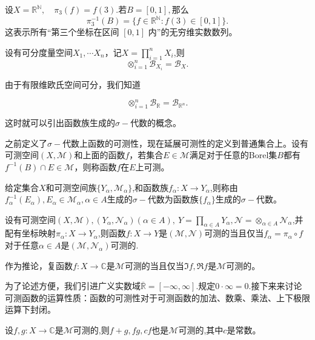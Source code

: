 \documentclass[lang=cn,10pt]{elegantbook}
\begin{document}
	\begin{example}[无穷维数列的坐标映射]
	设\(X = \mathbb{R}^\mathbb{N}, \quad \pi_3(f) = f(3).\)若\(B = [0,1],\)那么
	\[\pi_3^{-1}(B) = \{ f \in \mathbb{R}^\mathbb{N} : f(3) \in [0,1] \}.\]
	这表示所有“第三个坐标在区间 $[0,1]$ 内”的无穷维实数数列。
	\end{example}
	\begin{proposition}[P1.5]
		设有可分度量空间\(X_1,\cdots X_n\)，记\(X=\prod_{i=1}^{n}X_i\),则
		\[\otimes_{i=1}^n\mathcal{B}_{X_i}=\mathcal{B}_X.\]
	\end{proposition}
	由于有限维欧氏空间可分，我们知道
	\begin{corollary}[C1.6]
		\[\otimes_{i=1}^n\mathcal{B}_{\mathbb{R}}=\mathcal{B}_{\mathbb{R}^n}.\]
	\end{corollary}

	这时就可以引出函数族生成的\(\sigma-\)代数的概念。
	\begin{definition}
		之前定义了\(\sigma-\)代数上函数的可测性，现在延展可测性的定义到普通集合上。设有可测空间\((X,\mathcal{M})\)和上面的函数\(f\)，若集合\(E\in \mathcal{M}\)满足对于任意的Borel集\(B\)都有\(f^{-1}(B)\cap E\in \mathcal{M}\)，则称函数\(f\)在\(E\)上可测。

		给定集合\(X\)和可测空间族\(\{Y_\alpha,\mathcal{M}_\alpha\}\),和函数族\(f_\alpha:X\to Y_\alpha\),则称由\(f^{-1}_\alpha(E_\alpha),E_\alpha\in \mathcal{M}_\alpha,\alpha\in A\)生成的\(\sigma-\)代数为函数族\(\{f_\alpha\}\)生成的\(\sigma-\)代数。
	\end{definition}
	\begin{proposition}[P2.4]
		设有可测空间\((X,\mathcal{M}),(Y_\alpha,\mathcal{N}_\alpha)(\alpha\in A),\ Y=\prod_{\alpha\in A}Y_\alpha,\mathcal{N}=\otimes_{\alpha\in A}\mathcal{N}_\alpha\),并配有坐标映射\(\pi_\alpha:X\to Y_\alpha\),则函数\(f:X\to Y\)是\((\mathcal{M},\mathcal{N})\)可测的当且仅当\(f_\alpha=\pi_\alpha\circ f\)对于任意\(\alpha\in A\)是\((\mathcal{M},\mathcal{N}_\alpha)\)可测的.
	\end{proposition}
	\begin{corollary}[C2.5]
		作为推论，复函数\(f:X\to\mathbb{C}\)是\(\mathcal{M}\)可测的当且仅当\(\Im f,\Re f\)是\(\mathcal{M}\)可测的。
	\end{corollary}
	为了论述方便，我们引进广义实数域\(\overline{\mathbb{R}}=[-\infty,\infty].\)规定\(0\cdot \infty=0\).接下来来讨论可测函数的运算性质：函数的可测性对于可测函数的加法、数乘、乘法、上下极限运算下封闭。
	\begin{proposition}[P2.6]
		设\(f,g:X\to\mathbb{C}\)是\(\mathcal{M}\)可测的,则\(f+g,fg,cf\)也是\(\mathcal{M}\)可测的,其中\(c\)是常数。
	\end{proposition}
\end{document}
